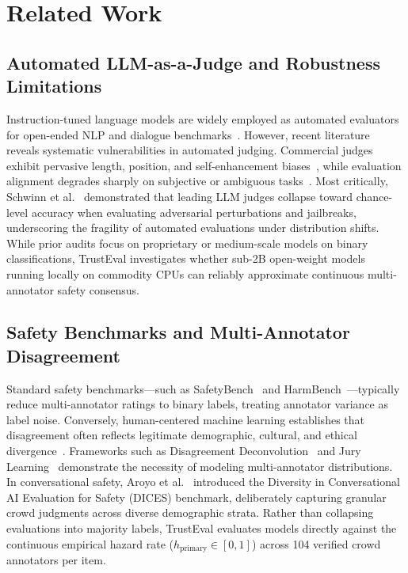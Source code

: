 \section{Related Work}
\label{sec:related_work}

\subsection{Automated LLM-as-a-Judge and Robustness Limitations}
\label{sec:rel_llm_judge}

Instruction-tuned language models are widely employed as automated evaluators for open-ended NLP and dialogue benchmarks~\cite{chiang2023vicuna,zheng2023judging,wang2023pandalm}. However, recent literature reveals systematic vulnerabilities in automated judging. Commercial judges exhibit pervasive length, position, and self-enhancement biases~\cite{tan2025judgebench}, while evaluation alignment degrades sharply on subjective or ambiguous tasks~\cite{bavaresco2025llms}. Most critically, Schwinn et al.~\cite{schwinn2026coin} demonstrated that leading LLM judges collapse toward chance-level accuracy when evaluating adversarial perturbations and jailbreaks, underscoring the fragility of automated evaluations under distribution shifts. While prior audits focus on proprietary or medium-scale models on binary classifications, TrustEval investigates whether sub-2B open-weight models running locally on commodity CPUs can reliably approximate continuous multi-annotator safety consensus.

\subsection{Safety Benchmarks and Multi-Annotator Disagreement}
\label{sec:rel_safety_disagreement}

Standard safety benchmarks—such as SafetyBench~\cite{zhang2024safetybench} and HarmBench~\cite{mazeika2024harmbench}—typically reduce multi-annotator ratings to binary labels, treating annotator variance as label noise. Conversely, human-centered machine learning establishes that disagreement often reflects legitimate demographic, cultural, and ethical divergence~\cite{basile2021we,davani2022dealing,rottger2022two}. Frameworks such as Disagreement Deconvolution~\cite{gordon2021disagreement} and Jury Learning~\cite{gordon2022jury} demonstrate the necessity of modeling multi-annotator distributions. In conversational safety, Aroyo et al.~\cite{aroyo2023dices} introduced the Diversity in Conversational AI Evaluation for Safety (DICES) benchmark, deliberately capturing granular crowd judgments across diverse demographic strata. Rather than collapsing evaluations into majority labels, TrustEval evaluates models directly against the continuous empirical hazard rate ($h_{\text{primary}} \in [0, 1]$) across 104 verified crowd annotators per item.

